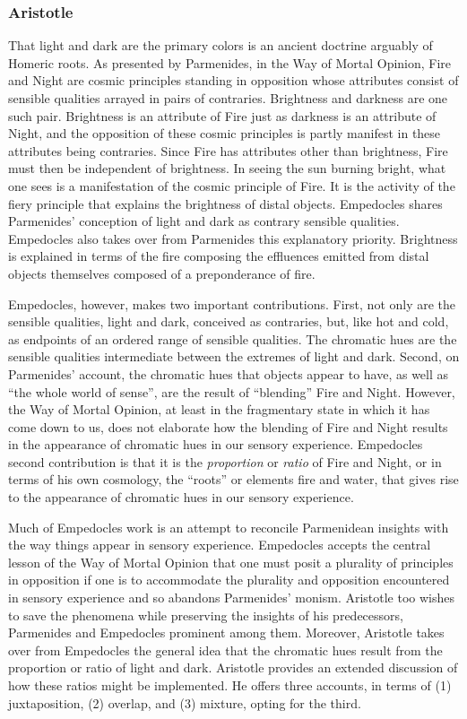 \begin{frame}[t]\frametitle{Aristotle}
	
\end{frame}

That light and dark are the primary colors is an ancient doctrine arguably of Homeric roots. As presented by Parmenides, in the Way of Mortal Opinion, Fire and Night are cosmic principles standing in opposition whose attributes consist of sensible qualities arrayed in pairs of contraries. Brightness and darkness are one such pair. Brightness is an attribute of Fire just as darkness is an attribute of Night, and the opposition of these cosmic principles is partly manifest in these attributes being contraries. Since Fire has attributes other than brightness, Fire must then be independent of brightness. In seeing the sun burning bright, what one sees is a manifestation of the cosmic principle of Fire. It is the activity of the fiery principle that explains the brightness of distal objects. Empedocles shares Parmenides' conception of light and dark as contrary sensible qualities. Empedocles also takes over from Parmenides this explanatory priority. Brightness is explained in terms of the fire composing the effluences emitted from distal objects themselves composed of a preponderance of fire.

Empedocles, however, makes two important contributions. First, not only are the sensible qualities, light and dark, conceived as contraries, but, like hot and cold, as endpoints of an ordered range of sensible qualities. The chromatic hues are the sensible qualities intermediate between the extremes of light and dark. Second, on Parmenides' account, the chromatic hues that objects appear to have, as well as ``the whole world of sense'', are the result of ``blending'' Fire and Night. However, the Way of Mortal Opinion, at least in the fragmentary state in which it has come down to us, does not elaborate how the blending of Fire and Night results in the appearance of chromatic hues in our sensory experience. Empedocles second contribution is that it is the \emph{proportion} or \emph{ratio} of Fire and Night, or in terms of his own cosmology, the ``roots'' or elements fire and water, that gives rise to the appearance of chromatic hues in our sensory experience. 

Much of Empedocles work is an attempt to reconcile Parmenidean insights with the way things appear in sensory experience. Empedocles accepts the central lesson of the Way of Mortal Opinion that one must posit a plurality of principles in opposition if one is to accommodate the plurality and opposition encountered in sensory experience and so abandons Parmenides' monism. Aristotle too wishes to save the phenomena while preserving the insights of his predecessors, Parmenides and Empedocles prominent among them. Moreover, Aristotle takes over from Empedocles the general idea that the chromatic hues result from the proportion or ratio of light and dark. Aristotle provides an extended discussion of how these ratios might be implemented. He offers three accounts, in terms of (1) juxtaposition, (2) overlap, and (3) mixture, opting for the third. \change

